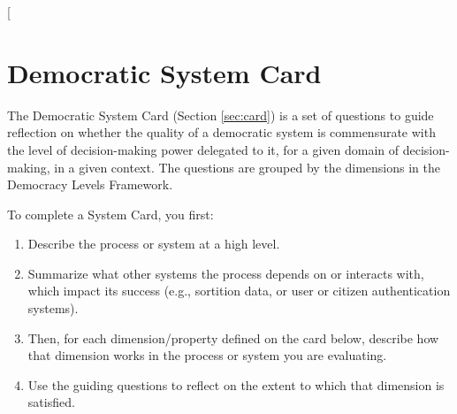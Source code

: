 \documentclass{article}
\begin{document}
\clearpage



\twocolumn
{}



\twocolumn[
    \section{Democratic System Card}
    \label{appendix:system-card}
    \vspace{4pt}
    
    The Democratic System Card (Section \ref{sec:card}) is a set of questions to guide reflection on whether the quality of a democratic system is commensurate with the level of decision-making power delegated to it, for a given domain of decision-making, in a given context. The questions are grouped by the dimensions in the Democracy Levels Framework.

    \vspace{4pt}
    To complete a System Card, you first:
    
    \begin{enumerate}\itemsep0em
        \item Describe the process or system at a high level.
        \item Summarize what other systems the process depends on or interacts with, which impact its success (e.g., sortition data, or user or citizen authentication systems).
        \item Then, for each dimension/property defined on the card below, describe how that dimension works in the process or system you are evaluating.
        \item Use the guiding questions to reflect on the extent to which that dimension is satisfied.
    \end{enumerate}
    
\end{document}
